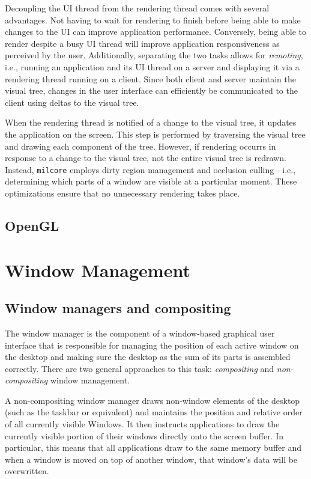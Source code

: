 \documentclass[10pt,twocolumn,a4paper]{article}
\begin{document}
			Decoupling the UI thread from the rendering thread comes with several
			advantages. Not having to wait for rendering to finish before being
			able to make changes to the UI can improve application performance.
			Conversely, being able to render despite a busy UI thread will improve
			application responsiveness as perceived by the user. Additionally,
			separating the two tasks allows for \textit{remoting}, i.e., running
			an application and its UI thread on a server and displaying it
			via a rendering thread running on a client. Since both client and
			server maintain the visual tree, changes in the user interface can
			efficiently be communicated to the client using deltas to the visual
			tree.
			\cite{goingdeep}

			When the rendering thread is notified of a change to the visual tree,
			it updates the application on the screen. This step is performed by
			traversing the visual tree and drawing each component of the tree.
			However, if rendering occurrs in response to a change to the visual
			tree, not the entire visual tree is redrawn. Instead, \texttt{milcore}
			employs dirty region management and occlusion culling---i.e.,
			determining which parts of a window are visible at a particular
			moment. These optimizations ensure that no unnecessary rendering takes
			place.
			\cite{goingdeep}

		\subsection{OpenGL}


	\section{Window Management}
		\subsection{Window managers and compositing}
			The window manager is the component of a window-based graphical user
			interface that is responsible for managing the position of each active
			window on the desktop and making sure the desktop as the sum of its
			parts is assembled correctly. There are two general approaches to this
			task: \emph{compositing} and \emph{non-compositing} window management.

			A non-compositing window manager draws non-window elements of the
			desktop (such as the taskbar or equivalent) and maintains the
			position and relative order of all currently visible Windows. It
			then instructs applications to draw the currently visible portion
			of their windows directly onto the screen buffer. In particular,
			this means that all applications draw to the same memory buffer and
			when a window is moved on top of another window, that window's data
			will be overwritten.
\end{document}
